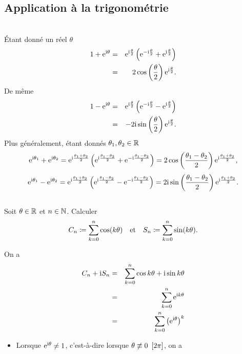 \documentclass{magnolia}
\begin{document}
\subsection{Application à la trigonométrie}
\begin{applications}
\\
  Étant donné un réel $\theta$
  \begin{eqnarray*}
  1+{\rm e}^{{\rm i}\theta} &=& {\rm e}^{{\rm i}\frac{\theta}{2}}\left( {\rm e}^{-{\rm i}\frac{\theta}{2}}
                                            +{\rm e}^{ {\rm i}\frac{\theta}{2}}\right)\\
                &=& 2\cos\left(\frac{\theta}{2}\right){\rm e}^{{\rm i}\frac{\theta}{2}}.
  \end{eqnarray*}
  De même
  \begin{eqnarray*}
  1-{\rm e}^{{\rm i}\theta} &=& {\rm e}^{{\rm i}\frac{\theta}{2}}\left( {\rm e}^{-{\rm i}\frac{\theta}{2}}
                                            -{\rm e}^{ {\rm i}\frac{\theta}{2}}\right)\\
                &=& -2{\rm i}\sin\left(\frac{\theta}{2}\right){\rm e}^{{\rm i}\frac{\theta}{2}}.
  \end{eqnarray*}
  Plus généralement, étant donnés $\theta_1,\theta_2\in\mathbb{R}$
  \[{\rm e}^{{\rm i}\theta_1}+{\rm e}^{{\rm i}\theta_2}={\rm e}^{{\rm i}\frac{\theta_1+\theta_2}{2}}\left({\rm e}^{{\rm i}\frac{\theta_1-\theta_2}{2}}+{\rm e}^{-{\rm i}\frac{\theta_1-\theta_2}{2}}\right)=
    2\cos\left(\frac{\theta_1-\theta_2}{2}\right){\rm e}^{{\rm i}\frac{\theta_1+\theta_2}{2}},\]
   \[{\rm e}^{{\rm i}\theta_1}-{\rm e}^{{\rm i}\theta_2}={\rm e}^{{\rm i}\frac{\theta_1+\theta_2}{2}}\left({\rm e}^{{\rm i}\frac{\theta_1-\theta_2}{2}}-{\rm e}^{-{\rm i}\frac{\theta_1-\theta_2}{2}}\right)=
    2{\rm i}\sin\left(\frac{\theta_1-\theta_2}{2}\right){\rm e}^{{\rm i}\frac{\theta_1+\theta_2}{2}}.\]   
\\
  Soit $\theta\in\mathbb{R}$ et $n\in\mathbb{N}$. Calculer
   \[C_n\coloneqq\sum_{k=0}^n \cos(k\theta) \quad \text{et} \quad
    S_n\coloneqq\sum_{k=0}^n \sin(k\theta).\]
  \begin{sol}
  On a
  \begin{eqnarray*}
  C_n+{\rm i} S_n &=& \sum_{k=0}^n \cos k\theta+{\rm i}\sin k\theta\\
           &=& \sum_{k=0}^n {\rm e}^{{\rm i} k\theta}\\
           &=& \sum_{k=0}^n \left({\rm e}^{{\rm i}\theta}\right)^k
  \end{eqnarray*}
  \begin{itemize}
  \item Lorsque ${\rm e}^{{\rm i}\theta}\neq 1$, c'est-à-dire lorsque
    $\theta\not\equiv 0\ \cro{2\pi}$, on a
    \begin{eqnarray*}

\end{eqnarray*}
\end{itemize}
\end{sol}
\end{applications}
\end{document}
